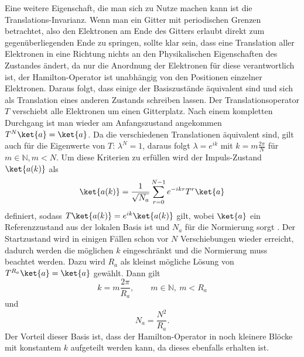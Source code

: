 Eine weitere Eigenschaft, die man sich zu Nutze machen kann ist die Translations-Invarianz. Wenn man ein Gitter mit periodischen Grenzen betrachtet, also den Elektronen am Ende des Gitters erlaubt direkt zum gegenüberliegenden Ende zu springen, sollte klar sein, dass eine Translation aller Elektronen in eine Richtung nichts an den Physikalischen Eigenschaften des Zustandes ändert, da nur die Anordnung der Elektronen für diese verantwortlich ist, der Hamilton-Operator ist unabhängig von den Positionen einzelner Elektronen. Daraus folgt, dass einige der Basiszustände äquivalent sind und sich als Translation eines anderen Zustands schreiben lassen. Der Translationsoperator $ T $ verschiebt alle Elektronen um einen Gitterplatz. Nach einem kompletten Durchgang ist man wieder am Anfangszustand angekommen $ T^N\ket{a} = \ket{a} $. Da die verschiedenen Translationen äquivalent sind, gilt auch für die Eigenwerte von $ T $: $ \lambda^N = 1 $, daraus folgt $ \lambda = e^{ik} $ mit $ k = m\frac{2\pi}{N} $ für $ m \in \mathbb{N}, m < N $. Um diese Kriterien zu erfüllen wird der Impuls-Zustand $ \ket{a(k)} $ als 
\begin{equation}\label{momentumstate}
\ket{a(k)} = \frac{1}{\sqrt{N_a}}\sum_{r=0}^{N-1}e^{-ikr}T^r\ket{a}
\end{equation}
definiert, sodass $ T\ket{a(k)} = e^{ik}\ket{a(k)}$ gilt, wobei $ \ket{a} $ ein Referenzzustand aus der lokalen Basis ist und $ N_a $ für die Normierung sorgt \cite{Sandvik}. Der Startzustand wird in einigen Fällen schon vor $ N $ Verschiebungen wieder erreicht, dadurch werden die möglichen $ k $ eingeschränkt und die Normierung muss beachtet werden. Dazu wird $ R_a $ als kleinst mögliche Lösung von $ T^{R_a}\ket{a} = \ket{a} $ gewählt. Dann gilt
\begin{equation}\label{k}
k = m\frac{2\pi}{R_a},\qquad m \in \mathbb{N},\: m < R_a
\end{equation}
und
\begin{equation}\label{N_a}
N_a = \frac{N^2}{R_a}.
\end{equation}
Der Vorteil dieser Basis ist, dass der Hamilton-Operator in noch kleinere Blöcke mit konstantem $ k $ aufgeteilt werden kann, da dieses ebenfalls erhalten ist.

